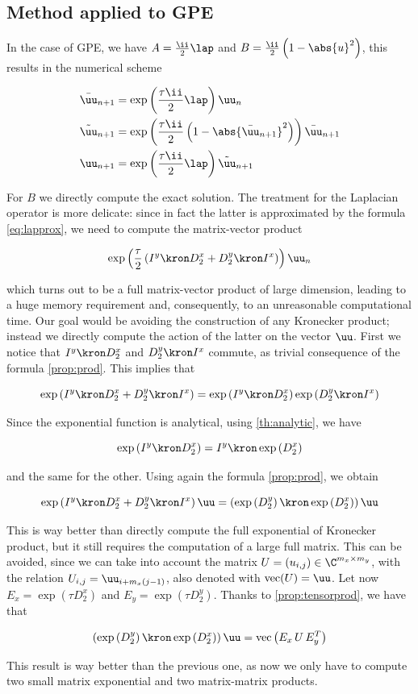 \subsection{Method applied to GPE}

In the case of GPE, we have $A = \frac\ii2 \lap$ and $B = \frac\ii2 \left(1 - \abs{u}^2\right)$, this results in the numerical scheme 

\begin{align*}
    \bar{\uu}_{n+1} &= \exp\left(\frac{\tau\ii}{2} \lap\right) \uu_n \\
    \tilde{\uu}_{n+1} &= \exp\left(\frac{\tau\ii}{2} \left(1 - \abs{\bar{\uu}_{n+1}}^2\right)\right)\bar{\uu}_{n+1} \\
    \uu_{n+1} &= \exp\left(\frac{\tau\ii}{2} \lap\right) \tilde{\uu}_{n+1}
\end{align*}

For $B$ we directly compute the exact solution. The treatment for the Laplacian operator is more delicate: since in fact the latter is approximated by the formula \ref{eq:lapprox}, we need to compute the matrix-vector product 

\[
    \exp\left(\frac\tau2 \left(I^y \kron D_2^x + D_2^y \kron I^x\right)\right)\uu_n
\]

which turns out to be a full matrix-vector product of large dimension, leading to a huge memory requirement and, consequently, to an unreasonable computational time. Our goal would be avoiding the construction of any Kronecker product; instead we directly compute the action of the latter on the vector $\uu$. First we notice that $I^y \kron D_2^x$ and $D_2^y \kron I^x$ commute, as trivial consequence of the formula \ref{prop:prod}. This implies that 

\[ \exp\left(I^y \kron D_2^x + D_2^y \kron I^x\right) = \exp\left(I^y \kron D_2^x\right)\exp\left(D_2^y \kron I^x\right) \]

Since the exponential function is analytical, using \ref{th:analytic}, we have

\[ \exp\left(I^y \kron D_2^x\right) = I^y \kron \exp\left(D_2^x\right) \]

and the same for the other. Using again the formula \ref{prop:prod}, we obtain 

\[ \exp\left(I^y \kron D_2^x + D_2^y \kron I^x\right)\uu = \left(\exp\left(D_2^y\right) \kron \exp\left(D_2^x\right)\right)\uu \]

This is way better than directly compute the full exponential of Kronecker product, but it still requires the computation of a large full matrix. This can be avoided, since we can take into account the matrix $U = (u_{i,j}) \in \C^{m_x \times m_y}$, with the relation $U_{i,j} = \uu_{i + m_x(j - 1)}$, also denoted with $\mbox{vec}(U) = \uu$. Let now $E_x = \exp\left(\tau D_2^x\right)$ and $E_y = \exp\left(\tau D_2^y\right)$. Thanks to \ref{prop:tensorprod}, we have that 

\[\left(\exp\left(D_2^y\right) \kron \exp\left(D_2^x\right)\right)\uu = \mathrm{vec}\left(E_x \, U \, E_y^T\right)\]

This result is way better than the previous one, as now we only have to compute two small matrix exponential and two matrix-matrix products.

